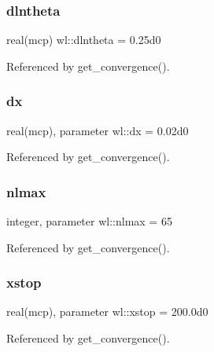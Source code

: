\mbox{\label{namespacewl_a1747377f03b9869d4c2736ecc5c83300}} 
\subsubsection{\texorpdfstring{dlntheta}{dlntheta}}
{\footnotesize\ttfamily real(mcp) wl\+::dlntheta = 0.\+25d0\hspace{0.3cm}{\ttfamily [private]}}



Referenced by get\+\_\+convergence().

\mbox{\label{namespacewl_af91a3d13d635d84de880af213be86336}} 
\subsubsection{\texorpdfstring{dx}{dx}}
{\footnotesize\ttfamily real(mcp), parameter wl\+::dx = 0.\+02d0\hspace{0.3cm}{\ttfamily [private]}}



Referenced by get\+\_\+convergence().

\mbox{\label{namespacewl_afc642e4e15f4400cf7729c68be5aa85d}} 
\subsubsection{\texorpdfstring{nlmax}{nlmax}}
{\footnotesize\ttfamily integer, parameter wl\+::nlmax = 65\hspace{0.3cm}{\ttfamily [private]}}



Referenced by get\+\_\+convergence().

\mbox{\label{namespacewl_a908028e399897f9b001a61a6f78b6349}} 
\subsubsection{\texorpdfstring{xstop}{xstop}}
{\footnotesize\ttfamily real(mcp), parameter wl\+::xstop = 200.\+0d0\hspace{0.3cm}{\ttfamily [private]}}



Referenced by get\+\_\+convergence().

